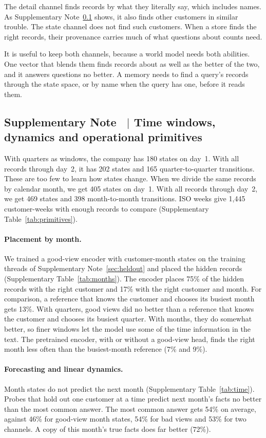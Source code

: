 \documentclass[11pt]{article}
\newcounter{suppnote}
\newcommand{\suppnote}[2]{\refstepcounter{suppnote}\label{#2}\subsection{Supplementary Note \thesuppnote\ $|$ #1}}
\begin{document}
The detail channel finds records by what they literally say, which includes names. As Supplementary Note~\ref{sec:primitives} shows, it also finds other customers in similar trouble. The state channel does not find such customers. When a store finds the right records, their provenance carries much of what questions about counts need.

It is useful to keep both channels, because a world model needs both abilities. One vector that blends them finds records about as well as the better of the two, and it answers questions no better. A memory needs to find a query's records through the state space, or by name when the query has one, before it reads them.

\suppnote{Time windows, dynamics and operational primitives}{sec:time}
\label{sec:primitives}
With quarters as windows, the company has 180 states on day~1. With all records through day~2, it has 202 states and 165 quarter-to-quarter transitions. These are too few to learn how states change. When we divide the same records by calendar month, we get 405 states on day~1. With all records through day~2, we get 469 states and 398 month-to-month transitions. ISO weeks give 1{,}445 customer-weeks with enough records to compare (Supplementary Table~\ref{tab:primitives}).

\paragraph{Placement by month.} We trained a good-view encoder with customer-month states on the training threads of Supplementary Note~\ref{sec:heldout} and placed the hidden records (Supplementary Table~\ref{tab:months}). The encoder places 75\% of the hidden records with the right customer and 17\% with the right customer and month. For comparison, a reference that knows the customer and chooses its busiest month gets 13\%. With quarters, good views did no better than a reference that knows the customer and chooses its busiest quarter. With months, they do somewhat better, so finer windows let the model use some of the time information in the text. The pretrained encoder, with or without a good-view head, finds the right month less often than the busiest-month reference (7\% and 9\%).

\paragraph{Forecasting and linear dynamics.} Month states do not predict the next month (Supplementary Table~\ref{tab:time}). Probes that hold out one customer at a time predict next month's facts no better than the most common answer. The most common answer gets 54\% on average, against 46\% for good-view month states, 54\% for bad views and 53\% for two channels. A copy of this month's true facts does far better (72\%).
\end{document}
